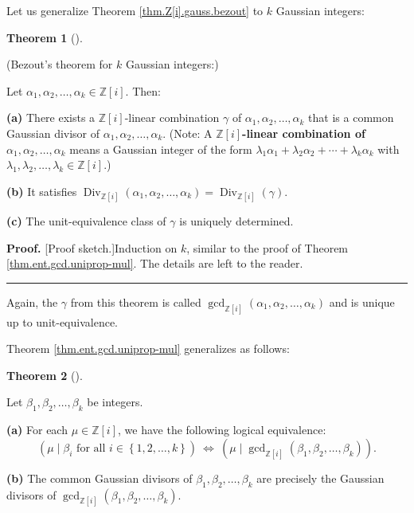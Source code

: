 \documentclass[numbers=enddot,12pt,final,onecolumn,notitlepage]{scrartcl}%
\numberwithin{exer}{subsection}
\theoremstyle{definition}
\newtheorem{theo}{Theorem}[subsection]
\newenvironment{theorem}[1][]
{\begin{theo}[#1]\begin{leftbar}}
{\end{leftbar}\end{theo}}
\newenvironment{proof}[1][Proof]{\noindent\textbf{#1.} }{\ \rule{0.5em}{0.5em}}
\newenvironment{noncompile}{}{}
\begin{document}
\begin{noncompile}
Let us generalize Theorem \ref{thm.Z[i].gauss.bezout} to $k$ Gaussian integers:

\begin{theorem}
(Bezout's theorem for $k$ Gaussian integers:)

Let $\alpha_{1},\alpha_{2},\ldots,\alpha_{k}\in\mathbb{Z}\left[  i\right]  $. Then:

\textbf{(a)} There exists a $\mathbb{Z}\left[  i\right]  $-linear combination
$\gamma$ of $\alpha_{1},\alpha_{2},\ldots,\alpha_{k}$ that is a common
Gaussian divisor of $\alpha_{1},\alpha_{2},\ldots,\alpha_{k}$. (Note: A
$\mathbb{Z}\left[  i\right]  $\textbf{-linear combination of }$\alpha
_{1},\alpha_{2},\ldots,\alpha_{k}$ means a Gaussian integer of the form
$\lambda_{1}\alpha_{1}+\lambda_{2}\alpha_{2}+\cdots+\lambda_{k}\alpha_{k}$
with $\lambda_{1},\lambda_{2},\ldots,\lambda_{k}\in\mathbb{Z}\left[  i\right]
$.)

\textbf{(b)} It satisfies $\operatorname*{Div}\nolimits_{\mathbb{Z}\left[
i\right]  }\left(  \alpha_{1},\alpha_{2},\ldots,\alpha_{k}\right)
=\operatorname*{Div}\nolimits_{\mathbb{Z}\left[  i\right]  }\left(
\gamma\right)  $.

\textbf{(c)} The unit-equivalence class of $\gamma$ is uniquely determined.
\end{theorem}

\begin{proof}
[Proof sketch.]Induction on $k$, similar to the proof of Theorem
\ref{thm.ent.gcd.uniprop-mul}. The details are left to the reader.
\end{proof}

Again, the $\gamma$ from this theorem is called $\gcd\nolimits_{\mathbb{Z}%
\left[  i\right]  }\left(  \alpha_{1},\alpha_{2},\ldots,\alpha_{k}\right)  $
and is unique up to unit-equivalence.

Theorem \ref{thm.ent.gcd.uniprop-mul} generalizes as follows:

\begin{theorem}
Let $\beta_{1},\beta_{2},\ldots,\beta_{k}$ be integers.

\textbf{(a)} For each $\mu\in\mathbb{Z}\left[  i\right]  $, we have the
following logical equivalence:%
\[
\left(  \mu\mid\beta_{i}\text{ for all }i\in\left\{  1,2,\ldots,k\right\}
\right)  \ \Longleftrightarrow\ \left(  \mu\mid\gcd\nolimits_{\mathbb{Z}%
\left[  i\right]  }\left(  \beta_{1},\beta_{2},\ldots,\beta_{k}\right)
\right)  .
\]


\textbf{(b)} The common Gaussian divisors of $\beta_{1},\beta_{2},\ldots
,\beta_{k}$ are precisely the Gaussian divisors of $\gcd\nolimits_{\mathbb{Z}%
\left[  i\right]  }\left(  \beta_{1},\beta_{2},\ldots,\beta_{k}\right)  $.


\end{theorem}
\end{noncompile}
\end{document}
